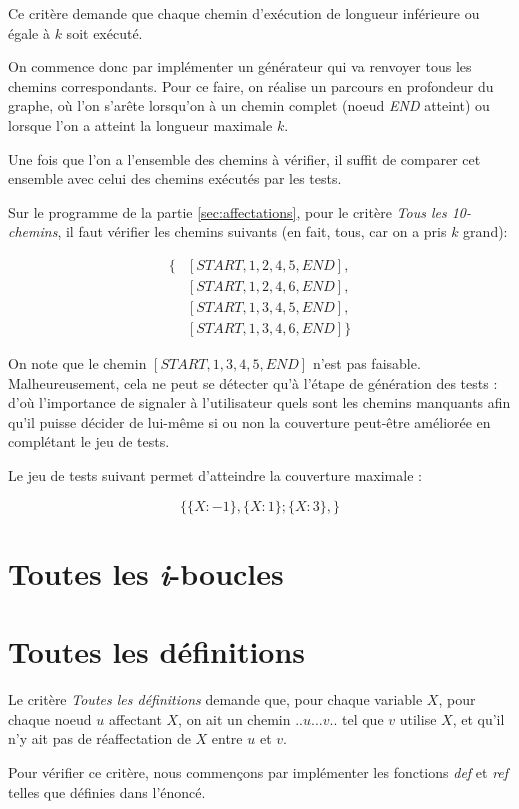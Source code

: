 Ce critère demande que chaque chemin d'exécution de longueur inférieure ou égale à $k$ soit exécuté.

On commence donc par implémenter un générateur qui va renvoyer tous les chemins correspondants. Pour ce faire, on réalise un parcours en profondeur du graphe, où l'on s'arête lorsqu'on à un chemin complet (noeud \textit{END} atteint) ou lorsque l'on a atteint la longueur maximale $k$.

Une fois que l'on a l'ensemble des chemins à vérifier, il suffit de comparer cet ensemble avec celui des chemins exécutés par les tests.

Sur le programme de la partie \ref{sec:affectations}, pour le critère \textit{Tous les 10-chemins}, il faut vérifier les chemins suivants (en fait, tous, car on a pris $k$ grand):

\begin{align*}
\{
	&[START, 1, 2, 4, 5, END],\\
	&[START, 1, 2, 4, 6, END],\\
	&[START, 1, 3, 4, 5, END],\\
	&[START, 1, 3, 4, 6, END]
\}
\end{align*}

On note que le chemin $[START, 1, 3, 4, 5, END]$ n'est pas faisable. Malheureusement, cela ne peut se détecter qu'à l'étape de génération des tests  : d'où l'importance de signaler à l'utilisateur quels sont les chemins manquants afin qu'il puisse décider de lui-même si ou non la couverture peut-être améliorée en complétant le jeu de tests.

Le jeu de tests suivant permet d'atteindre la couverture maximale :

\[ \{
	\{ X : -1\},
	\{ X : 1\};
	\{ X : 3\},
\} \]


\section{Toutes les \textit{i}-boucles}
\section{Toutes les définitions}

Le critère \textit{Toutes les définitions} demande que, pour chaque variable $X$, pour chaque noeud $u$ affectant $X$, on ait un chemin $..u...v..$ tel que $v$ utilise $X$, et qu'il n'y ait pas de réaffectation de $X$ entre $u$ et $v$.

Pour vérifier ce critère, nous commençons par implémenter les fonctions \textit{def} et \textit{ref} telles que définies dans l'énoncé.

